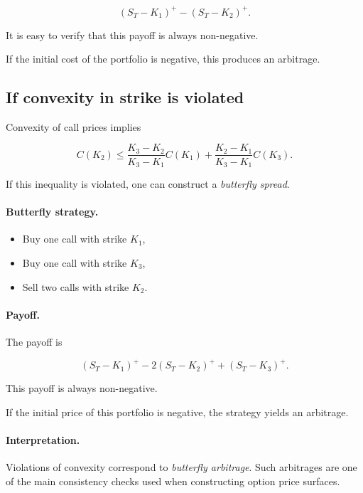 \documentclass[11pt]{article}
\newcommand{\1}{\mathbf{1}}
\theoremstyle{plain}
\theoremstyle{definition}
\theoremstyle{remark}
\begin{document}
\[
(S_T-K_1)^+ - (S_T-K_2)^+ .
\]

It is easy to verify that this payoff is always non-negative.

If the initial cost of the portfolio is negative,
this produces an arbitrage.

\subsection{If convexity in strike is violated}

Convexity of call prices implies

\[
C(K_2)
\le
\frac{K_3-K_2}{K_3-K_1}C(K_1)
+
\frac{K_2-K_1}{K_3-K_1}C(K_3).
\]

If this inequality is violated,
one can construct a \emph{butterfly spread}.

\paragraph{Butterfly strategy.}

\begin{itemize}[leftmargin=1.4em]
\item Buy one call with strike \(K_1\),
\item Buy one call with strike \(K_3\),
\item Sell two calls with strike \(K_2\).
\end{itemize}

\paragraph{Payoff.}

The payoff is

\[
(S_T-K_1)^+ - 2(S_T-K_2)^+ + (S_T-K_3)^+.
\]

This payoff is always non-negative.

If the initial price of this portfolio is negative,
the strategy yields an arbitrage.

\paragraph{Interpretation.}

Violations of convexity correspond to
\emph{butterfly arbitrage}.
Such arbitrages are one of the main consistency checks
used when constructing option price surfaces.
\end{document}
